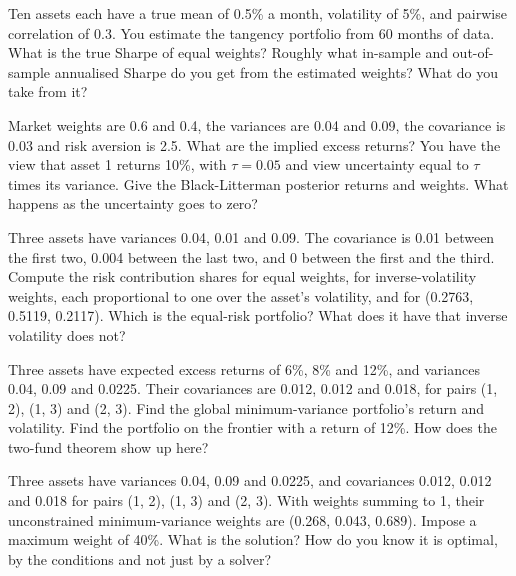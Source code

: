 \begin{question}\label{iq:iv2:portfolio-construction:18}
Ten assets each have a true mean of 0.5\% a month, volatility of 5\%, and pairwise correlation of 0.3. You estimate the tangency portfolio from 60 months of data. What is the true Sharpe of equal weights? Roughly what in-sample and out-of-sample annualised Sharpe do you get from the estimated weights? What do you take from it?
\end{question}

\begin{question}\label{iq:iv2:portfolio-construction:19}
Market weights are 0.6 and 0.4, the variances are 0.04 and 0.09, the covariance is 0.03 and risk aversion is 2.5. What are the implied excess returns? You have the view that asset 1 returns 10\%, with $\tau = 0.05$ and view uncertainty equal to $\tau$ times its variance. Give the Black-Litterman posterior returns and weights. What happens as the uncertainty goes to zero?
\end{question}

\begin{question}\label{iq:iv2:portfolio-construction:20}
Three assets have variances 0.04, 0.01 and 0.09. The covariance is 0.01 between the first two, 0.004 between the last two, and 0 between the first and the third. Compute the risk contribution shares for equal weights, for inverse-volatility weights, each proportional to one over the asset's volatility, and for (0.2763, 0.5119, 0.2117). Which is the equal-risk portfolio? What does it have that inverse volatility does not?
\end{question}

\begin{question}\label{iq:iv2:portfolio-construction:21}
Three assets have expected excess returns of 6\%, 8\% and 12\%, and variances 0.04, 0.09 and 0.0225. Their covariances are 0.012, 0.012 and 0.018, for pairs (1, 2), (1, 3) and (2, 3). Find the global minimum-variance portfolio's return and volatility. Find the portfolio on the frontier with a return of 12\%. How does the two-fund theorem show up here?
\end{question}

\begin{question}\label{iq:iv2:portfolio-construction:22}
Three assets have variances 0.04, 0.09 and 0.0225, and covariances 0.012, 0.012 and 0.018 for pairs (1, 2), (1, 3) and (2, 3). With weights summing to 1, their unconstrained minimum-variance weights are (0.268, 0.043, 0.689). Impose a maximum weight of 40\%. What is the solution? How do you know it is optimal, by the conditions and not just by a solver?
\end{question}

